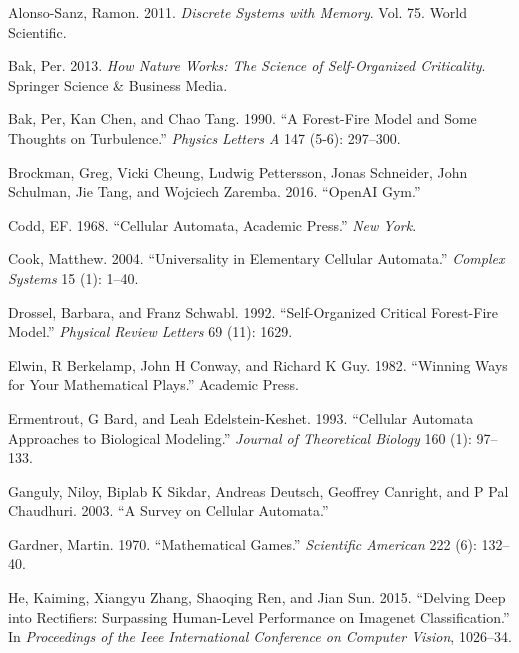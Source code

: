 \documentclass[
  openany]{book}
\newlength{\cslhangindent}
\newenvironment{cslreferences}%
  {\setlength{\parindent}{0pt}%
  \everypar{\setlength{\hangindent}{\cslhangindent}}\ignorespaces}%
  {\par}
\begin{document}
\hypertarget{refs}{}
\begin{cslreferences}
\leavevmode\hypertarget{ref-alonso2011discrete}{}%
Alonso-Sanz, Ramon. 2011. \emph{Discrete Systems with Memory}. Vol. 75. World Scientific.

\leavevmode\hypertarget{ref-bak2013nature}{}%
Bak, Per. 2013. \emph{How Nature Works: The Science of Self-Organized Criticality}. Springer Science \& Business Media.

\leavevmode\hypertarget{ref-bak1990forest}{}%
Bak, Per, Kan Chen, and Chao Tang. 1990. ``A Forest-Fire Model and Some Thoughts on Turbulence.'' \emph{Physics Letters A} 147 (5-6): 297--300.

\leavevmode\hypertarget{ref-1606.01540}{}%
Brockman, Greg, Vicki Cheung, Ludwig Pettersson, Jonas Schneider, John Schulman, Jie Tang, and Wojciech Zaremba. 2016. ``OpenAI Gym.''

\leavevmode\hypertarget{ref-codd1968cellular}{}%
Codd, EF. 1968. ``Cellular Automata, Academic Press.'' \emph{New York}.

\leavevmode\hypertarget{ref-cook2004universality}{}%
Cook, Matthew. 2004. ``Universality in Elementary Cellular Automata.'' \emph{Complex Systems} 15 (1): 1--40.

\leavevmode\hypertarget{ref-drossel1992self}{}%
Drossel, Barbara, and Franz Schwabl. 1992. ``Self-Organized Critical Forest-Fire Model.'' \emph{Physical Review Letters} 69 (11): 1629.

\leavevmode\hypertarget{ref-elwin1982winning}{}%
Elwin, R Berkelamp, John H Conway, and Richard K Guy. 1982. ``Winning Ways for Your Mathematical Plays.'' Academic Press.

\leavevmode\hypertarget{ref-ermentrout1993cellular}{}%
Ermentrout, G Bard, and Leah Edelstein-Keshet. 1993. ``Cellular Automata Approaches to Biological Modeling.'' \emph{Journal of Theoretical Biology} 160 (1): 97--133.

\leavevmode\hypertarget{ref-ganguly2003survey}{}%
Ganguly, Niloy, Biplab K Sikdar, Andreas Deutsch, Geoffrey Canright, and P Pal Chaudhuri. 2003. ``A Survey on Cellular Automata.''

\leavevmode\hypertarget{ref-gardner1970mathematical}{}%
Gardner, Martin. 1970. ``Mathematical Games.'' \emph{Scientific American} 222 (6): 132--40.

\leavevmode\hypertarget{ref-he2015delving}{}%
He, Kaiming, Xiangyu Zhang, Shaoqing Ren, and Jian Sun. 2015. ``Delving Deep into Rectifiers: Surpassing Human-Level Performance on Imagenet Classification.'' In \emph{Proceedings of the Ieee International Conference on Computer Vision}, 1026--34.


\end{cslreferences}
\end{document}
